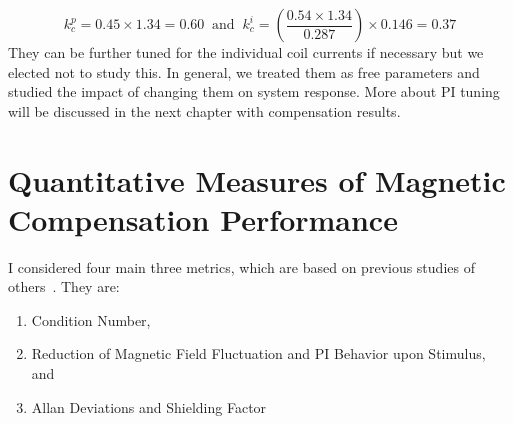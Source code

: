 \begin{equation}
    k_c^p=0.45\times1.34=0.60\;\;\text{and}\;\; k_c^i=\left(\frac{0.54 \times1.34}{0.287}\right)\times0.146=0.37
\end{equation}
They can be further tuned for the individual coil currents if necessary but we elected not to study this. In general, we treated them as free parameters and studied the impact of changing them on system response. More about PI tuning will be discussed in the next chapter with compensation results.








 
 
% 





\section{Quantitative Measures of Magnetic Compensation Performance\label{sec:metrics}}
I considered four main three metrics, which are based on previous studies of others~\cite{bea,lins,rawlik}. They are:

\begin{enumerate}
    \item Condition Number,
    \item Reduction of Magnetic Field Fluctuation and PI Behavior upon Stimulus, and
    \item Allan Deviations and Shielding Factor
\end{enumerate}


